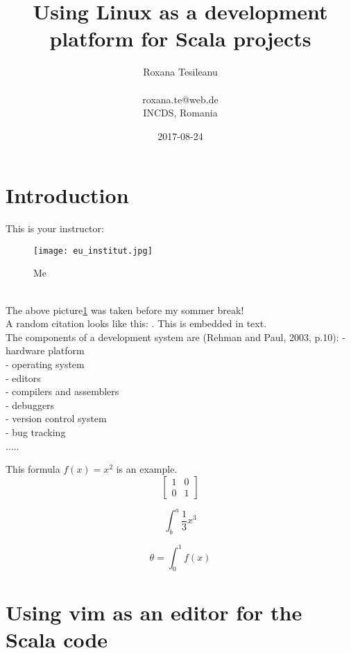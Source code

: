 \documentclass{article}
\title{Using Linux as a development platform for Scala projects}
\date{2017-08-24}
\author{Roxana Tesileanu \\ 
\\ 
roxana.te@web.de \\
INCDS, Romania }
\begin{document}
	\maketitle
	\newpage

\tableofcontents
\newpage

\section{Introduction}

This is your instructor:\\
\begin{figure} [h!]
 \texttt{[image: eu\_institut.jpg]}
 \caption{Me}
 \label{fig: Roxi}
\end{figure}
\\
The above picture\ref{fig: Roxi}  was taken before my sommer break!
\\


A random citation looks like this: \cite{odersky_programming_2010}. This is embedded in text. \\
The components of a development system are (Rehman and Paul, 2003, p.10):\newline
- hardware platform \\
- operating system \\
- editors \\
- compilers and assemblers \\
- debuggers \\
- version control system \\
- bug tracking \\

.....

This formula $f(x) = x^2$ is an example.
\begin{equation}
\left[
\begin{matrix}
1 & 0 \\
0 & 1
\end{matrix}
\right]
\end{equation}

\begin{equation}
\int^a_b\frac{1}{3}x^3
\end{equation}

\begin{equation}
\theta = \int^1_0 f(x)
\end{equation}



\section{Using vim as an editor for the Scala code}
\end{document}
